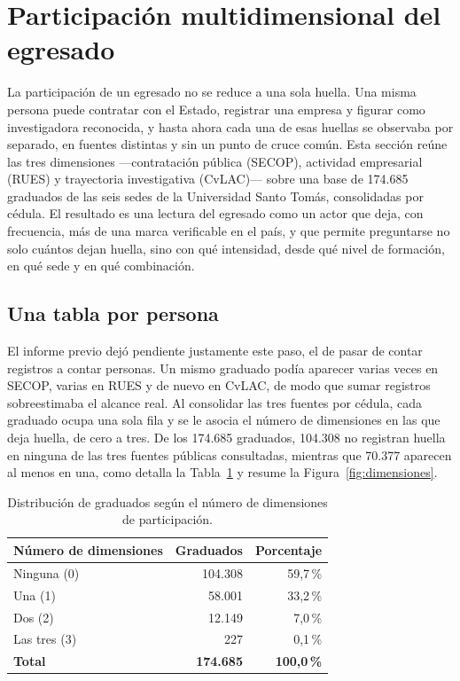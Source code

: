 \section{Participación multidimensional del egresado}

La participación de un egresado no se reduce a una sola huella. Una misma persona puede contratar con el Estado, registrar una empresa y figurar como investigadora reconocida, y hasta ahora cada una de esas huellas se observaba por separado, en fuentes distintas y sin un punto de cruce común. Esta sección reúne las tres dimensiones ---contratación pública (SECOP), actividad empresarial (RUES) y trayectoria investigativa (CvLAC)--- sobre una base de 174.685 graduados de las seis sedes de la Universidad Santo Tomás, consolidadas por cédula. El resultado es una lectura del egresado como un actor que deja, con frecuencia, más de una marca verificable en el país, y que permite preguntarse no solo cuántos dejan huella, sino con qué intensidad, desde qué nivel de formación, en qué sede y en qué combinación.

\subsection{Una tabla por persona}

El informe previo dejó pendiente justamente este paso, el de pasar de contar registros a contar personas. Un mismo graduado podía aparecer varias veces en SECOP, varias en RUES y de nuevo en CvLAC, de modo que sumar registros sobreestimaba el alcance real. Al consolidar las tres fuentes por cédula, cada graduado ocupa una sola fila y se le asocia el número de dimensiones en las que deja huella, de cero a tres. De los 174.685 graduados, 104.308 no registran huella en ninguna de las tres fuentes públicas consultadas, mientras que 70.377 aparecen al menos en una, como detalla la Tabla~\ref{tab:dist-dimensiones} y resume la Figura~\ref{fig:dimensiones}.

\begin{table}[H]
\centering
\caption{Distribución de graduados según el número de dimensiones de participación.}
\label{tab:dist-dimensiones}
\begin{tabularx}{0.78\linewidth}{Xrr}
\toprule
\rowcolor{ustaazul}\textbf{\color{white}Número de dimensiones} & \textbf{\color{white}Graduados} & \textbf{\color{white}Porcentaje} \\
\midrule
Ninguna (0) & 104.308 & 59,7\,\% \\
Una (1) & 58.001 & 33,2\,\% \\
Dos (2) & 12.149 & 7,0\,\% \\
Las tres (3) & 227 & 0,1\,\% \\
\midrule
\textbf{Total} & \textbf{174.685} & \textbf{100,0\,\%} \\
\bottomrule
\end{tabularx}
\end{table}

